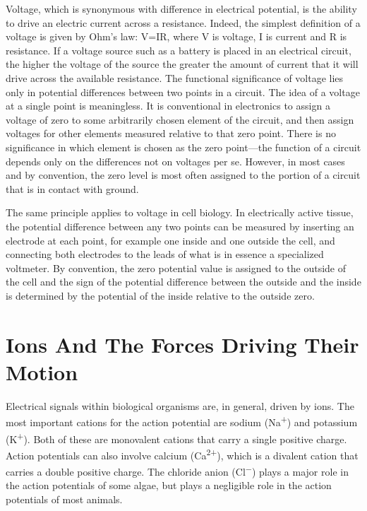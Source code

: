 Voltage, which is synonymous with difference in electrical potential, is the ability to drive an electric current across a resistance. Indeed, the simplest definition of a voltage is given by Ohm's law: V=IR, where V is voltage, I is current and R is resistance. If a voltage source such as a battery is placed in an electrical circuit, the higher the voltage of the source the greater the amount of current that it will drive across the available resistance. The functional significance of voltage lies only in potential differences between two points in a circuit. The idea of a voltage at a single point is meaningless. It is conventional in electronics to assign a voltage of zero to some arbitrarily chosen element of the circuit, and then assign voltages for other elements measured relative to that zero point. There is no significance in which element is chosen as the zero point---the function of a circuit depends only on the differences not on voltages per se. However, in most cases and by convention, the zero level is most often assigned to the portion of a circuit that is in contact with ground.

The same principle applies to voltage in cell biology. In electrically active tissue, the potential difference between any two points can be measured by inserting an electrode at each point, for example one inside and one outside the cell, and connecting both electrodes to the leads of what is in essence a specialized voltmeter. By convention, the zero potential value is assigned to the outside of the cell and the sign of the potential difference between the outside and the inside is determined by the potential of the inside relative to the outside zero.

\hypertarget{ions-and-the-forces-driving-their-motion}{%
\section{Ions And The Forces Driving Their Motion}\label{ions-and-the-forces-driving-their-motion}}

Electrical signals within biological organisms are, in general, driven by ions. The most important cations for the action potential are sodium (Na\textsuperscript{+}) and potassium (K\textsuperscript{+}). Both of these are monovalent cations that carry a single positive charge. Action potentials can also involve calcium (Ca\textsuperscript{2+}), which is a divalent cation that carries a double positive charge. The chloride anion (Cl\textsuperscript{−}) plays a major role in the action potentials of some algae, but plays a negligible role in the action potentials of most animals.

